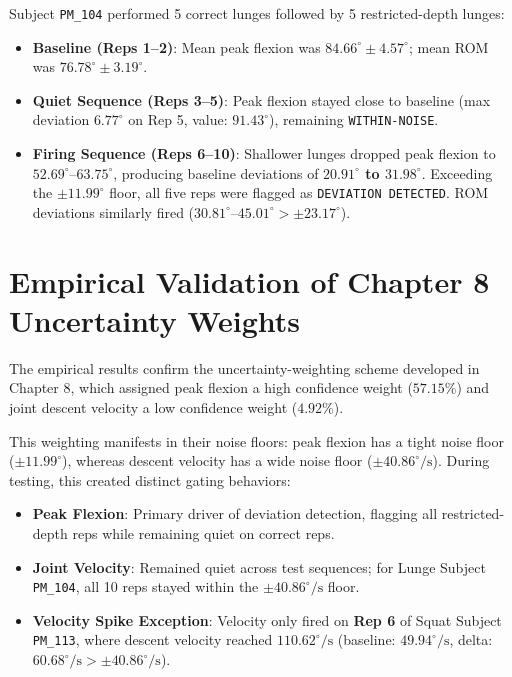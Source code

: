 Subject \texttt{PM\_104} performed 5 correct lunges followed by 5 restricted-depth lunges:
\begin{itemize}
  \item \textbf{Baseline (Reps 1–2)}: Mean peak flexion was \textbf{$84.66^\circ \pm 4.57^\circ$}; mean ROM was \textbf{$76.78^\circ \pm 3.19^\circ$}.
  \item \textbf{Quiet Sequence (Reps 3–5)}: Peak flexion stayed close to baseline (max deviation \textbf{$6.77^\circ$} on Rep 5, value: $91.43^\circ$), remaining \texttt{WITHIN-NOISE}.
  \item \textbf{Firing Sequence (Reps 6–10)}: Shallower lunges dropped peak flexion to $52.69^\circ\text{--}63.75^\circ$, producing baseline deviations of \textbf{$20.91^\circ$ to $31.98^\circ$}. Exceeding the $\pm 11.99^\circ$ floor, all five reps were flagged as \texttt{DEVIATION DETECTED}. ROM deviations similarly fired ($30.81^\circ\text{--}45.01^\circ > \pm 23.17^\circ$).
\end{itemize}



\section{Empirical Validation of Chapter 8 Uncertainty Weights}
\label{sec:9-4-empirical-validation-of-chapter-8-uncertainty-weights}


The empirical results confirm the uncertainty-weighting scheme developed in Chapter 8, which assigned peak flexion a high confidence weight (\textbf{$57.15\%$}) and joint descent velocity a low confidence weight (\textbf{$4.92\%$}).

This weighting manifests in their noise floors: peak flexion has a tight noise floor ($\pm 11.99^\circ$), whereas descent velocity has a wide noise floor ($\pm 40.86^\circ/\text{s}$). During testing, this created distinct gating behaviors:
\begin{itemize}
  \item \textbf{Peak Flexion}: Primary driver of deviation detection, flagging all restricted-depth reps while remaining quiet on correct reps.
  \item \textbf{Joint Velocity}: Remained quiet across test sequences; for Lunge Subject \texttt{PM\_104}, all 10 reps stayed within the $\pm 40.86^\circ/\text{s}$ floor.
  \item \textbf{Velocity Spike Exception}: Velocity only fired on \textbf{Rep 6} of Squat Subject \texttt{PM\_113}, where descent velocity reached \textbf{$110.62^\circ/\text{s}$} (baseline: $49.94^\circ/\text{s}$, delta: \textbf{$60.68^\circ/\text{s} > \pm 40.86^\circ/\text{s}$}).
\end{itemize}

